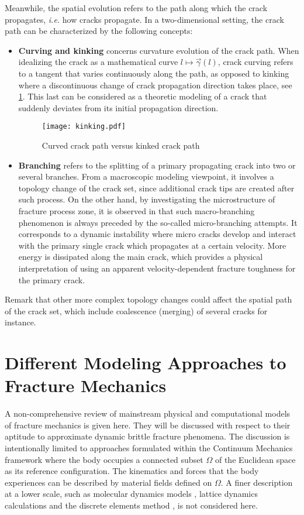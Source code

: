 Meanwhile, the spatial evolution refers to the path along which the crack propagates, \emph{i.e.} how cracks propagate. In a two-dimensional setting, the crack path can be characterized by the following concepts:
\begin{itemize}
\item \textbf{Curving and kinking} concerns curvature evolution of the crack path. When idealizing the crack as a mathematical curve $l\mapsto\vec{\gamma}(l)$, crack curving refers to a tangent that varies continuously along the path, as opposed to kinking where a discontinuous change of crack propagation direction takes place, see \cref{fig:kink}. This last can be considered as a theoretic modeling of a crack that suddenly deviates from its initial propagation direction.
\begin{figure}[htbp]
\centering
\texttt{[image: kinking.pdf]}
\caption{Curved crack path versus kinked crack path} \label{fig:kink}
\end{figure}

\item \textbf{Branching} refers to the splitting of a primary propagating crack into two or several branches. From a macroscopic modeling viewpoint, it involves a topology change of the crack set, since additional crack tips are created after such process. On the other hand, by investigating the microstructure of fracture process zone, it is observed in \cite{Ravi-ChandarKnauss:1984,Ravi-ChandarKnauss:1984a} that such macro-branching phenomenon is always preceded by the so-called micro-branching attempts. It corresponds to a dynamic instability \cite{FinebergMarder:1999} where micro cracks develop and interact with the primary single crack which propagates at a certain velocity. More energy is dissipated along the main crack, which provides a physical interpretation of using an apparent velocity-dependent fracture toughness for the primary crack.
\end{itemize}
Remark that other more complex topology changes could affect the spatial path of the crack set, which include coalescence (merging) of several cracks for instance.

\section{Different Modeling Approaches to Fracture Mechanics} \label{sec:discretemodels}
A non-comprehensive review of mainstream physical and computational models of fracture mechanics is given here. They will be discussed with respect to their aptitude to approximate dynamic brittle fracture phenomena. The discussion is intentionally limited to approaches formulated within the Continuum Mechanics framework where the body occupies a connected subset $\Omega$ of the Euclidean space as its reference configuration. The kinematics and forces that the body experiences can be described by material fields defined on $\Omega$. A finer description at a lower scale, such as molecular dynamics models \cite{AbrahamBrodbeckRafeyRudge:1994}, lattice dynamics calculations \cite{MarderGross:1995} and the discrete elements method \cite{HentzDonzeDaudeville:2004}, is not considered here.

